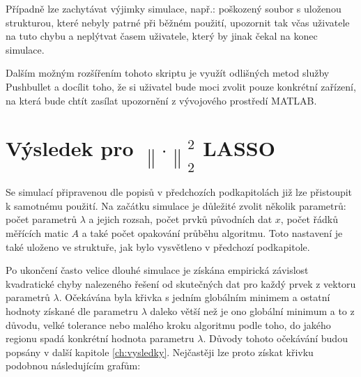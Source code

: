 \documentclass[FM,BP]{tulthesis}
\begin{document}
Případně lze zachytávat výjimky simulace, např.: poškozený soubor s uloženou strukturou, které nebyly patrné při běžném použití, upozornit tak včas uživatele na tuto chybu a neplýtvat časem uživatele, který by jinak čekal na konec simulace.

Dalším možným rozšířením tohoto skriptu je využít odlišných metod služby Pushbullet a docílit toho, že si uživatel bude moci zvolit pouze konkrétní zařízení, na která bude chtít zasílat upozornění z vývojového prostředí MATLAB.

\section{Výsledek pro $\left\| \cdot \right\|_{2}^{2}$ LASSO}
\label{subch:resultL22}
Se simulací připravenou dle popisů v předchozích podkapitolách již lze přistoupit k samotnému použití. Na začátku simulace je důležité zvolit několik parametrů: počet parametrů $\lambda$ a jejich rozsah, počet prvků původních dat $x$, počet řádků měřících matic $A$ a také počet opakování průběhu algoritmu. Toto nastavení je také uloženo ve struktuře, jak bylo vysvětleno v předchozí podkapitole. 

Po ukončení často velice dlouhé simulace je získána empirická závislost kvadratické chyby nalezeného řešení od skutečných dat pro každý prvek z vektoru parametrů $\lambda$. Očekávána byla křivka s jedním globálním minimem a ostatní hodnoty získané dle parametru $\lambda$ daleko větší než je ono globální minimum a to z důvodu, velké tolerance nebo malého kroku algoritmu podle toho, do jakého regionu spadá konkrétní hodnota parametru $\lambda$. Důvody tohoto očekávání budou popsány v další kapitole \ref{ch:vysledky}. Nejčastěji lze proto získat křivku podobnou následujícím grafům: 
\end{document}
